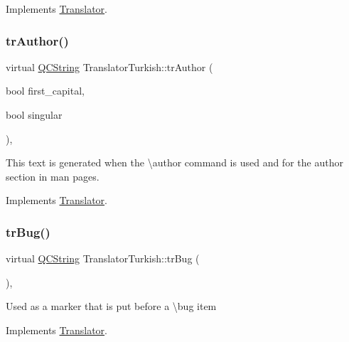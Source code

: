 Implements \mbox{\hyperlink{class_translator}{Translator}}.

\mbox{\label{class_translator_turkish_a58ab59b4cf5081844fff9ff9e01a223b}} 
\subsubsection{\texorpdfstring{trAuthor()}{trAuthor()}}
{\footnotesize\ttfamily virtual \mbox{\hyperlink{class_q_c_string}{Q\+C\+String}} Translator\+Turkish\+::tr\+Author (\begin{DoxyParamCaption}\item[{bool}]{first\+\_\+capital,  }\item[{bool}]{singular }\end{DoxyParamCaption})\hspace{0.3cm}{\ttfamily [inline]}, {\ttfamily [virtual]}}

This text is generated when the \textbackslash{}author command is used and for the author section in man pages. 

Implements \mbox{\hyperlink{class_translator}{Translator}}.

\mbox{\label{class_translator_turkish_ae2bbe60996730e3d44d5d8a74aadcade}} 
\subsubsection{\texorpdfstring{trBug()}{trBug()}}
{\footnotesize\ttfamily virtual \mbox{\hyperlink{class_q_c_string}{Q\+C\+String}} Translator\+Turkish\+::tr\+Bug (\begin{DoxyParamCaption}{ }\end{DoxyParamCaption})\hspace{0.3cm}{\ttfamily [inline]}, {\ttfamily [virtual]}}

Used as a marker that is put before a \textbackslash{}bug item 

Implements \mbox{\hyperlink{class_translator}{Translator}}.

\mbox{\label{class_translator_turkish_acdbf36434f029278c7858cb786a6d56d}} 
